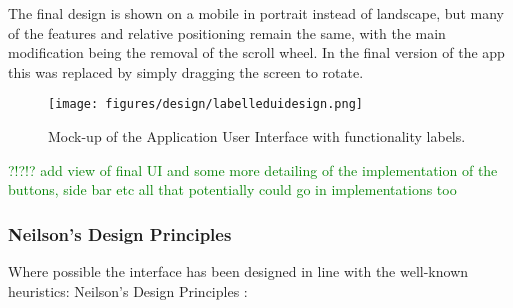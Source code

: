 \documentclass{article}
\newcommand{\could}[1]{\textcolor{green}{#1}}
\begin{document}
The final design is shown on a mobile in portrait instead of landscape, but many of the features and relative positioning remain the same, with the main modification being the removal of the scroll wheel. In the final version of the app this was replaced by simply dragging the screen to rotate.

\begin{figure}[h]
    \centering
    \texttt{[image: figures/design/labelleduidesign.png]}
        \caption{Mock-up of the Application User Interface with functionality labels.}
        \label{fig:uimockup}
\end{figure}

\could{?!?!? add view of final UI and some more detailing of the implementation of the buttons, side bar etc all that potentially could go in implementations too}

\subsubsection{Neilson's Design Principles}
Where possible the interface has been designed in line with the well-known heuristics: Neilson's Design Principles \cite{design:neilsons}:
\end{document}
